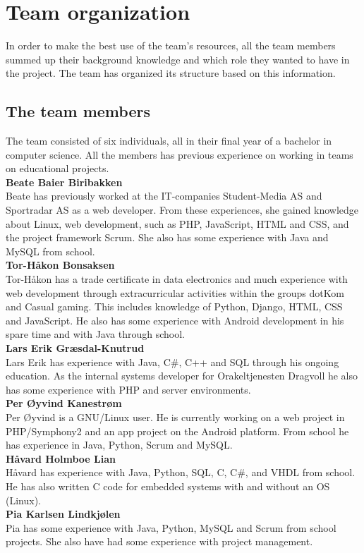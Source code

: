 \newpage
\section{Team organization}
In order to make the best use of the team's resources, all the team members summed up their background knowledge and which role they wanted to have in the project. The team has organized its structure based on this information.

\subsection{The team members}
The team consisted of six individuals, all in their final year of a bachelor in computer science. All the members has previous experience on working in teams on educational projects.\\

\noindent\textbf{Beate Baier Biribakken}\\
Beate has previously worked at the IT-companies Student-Media AS and Sportradar AS as a web developer. From these experiences, she gained knowledge about Linux, web development, such as PHP, JavaScript, HTML and CSS, and the project framework Scrum. She also has some experience with Java and MySQL from school.\\

\noindent\textbf{Tor-Håkon Bonsaksen}\\
Tor-Håkon has a trade certificate in data electronics and much experience with web development through extracurricular activities within the groups dotKom and Casual gaming. This includes knowledge of Python, Django, HTML, CSS and JavaScript. He also has some experience with Android development in his spare time and with Java through school.\\

\noindent\textbf{Lars Erik Græsdal-Knutrud}\\
Lars Erik has experience with Java, C\#, C++ and SQL through his ongoing education. As the internal systems developer for Orakeltjenesten Dragvoll he also has some experience with PHP and server environments. \\

\noindent\textbf{Per Øyvind Kanestrøm}\\
Per Øyvind is a GNU/Linux user. He is currently working on a web project in PHP/Symphony2 and an app project on the Android platform. From school he has experience in Java, Python, Scrum and MySQL.\\

\noindent\textbf{Håvard Holmboe Lian}\\
Håvard has experience with Java, Python, SQL, C, C\#, and VHDL from school. He has also written C code for embedded systems with and without an OS (Linux).\\ 

\noindent\textbf{Pia	Karlsen	Lindkjølen}\\
Pia has some experience with Java, Python, MySQL and Scrum from school projects. She also have had some experience with project management. 